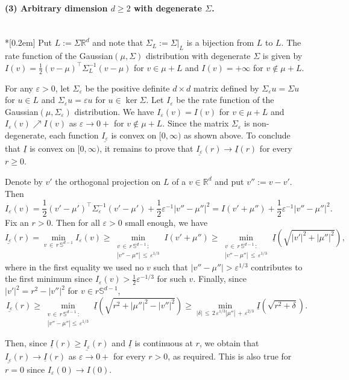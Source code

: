 \documentclass[AHL,Unicode,published]{cedram}
\newcommand{\ubar}[1]{\underline{#1}}
\newcommand{\Rbb}{\mathbb{R}}
\newcommand{\Sbb}{\mathbb{S}}
\begin{document}
\begin{proofc}
\paragraph{(3) Arbitrary dimension $d \ge 2$ with degenerate $\Sigma$.}\ \\*[0.2em]
Put $L:=\Sigma \Rbb^d$ and note that $\Sigma_L:={\Sigma|}_L$ is a bijection from $L$ to $L$. The rate function of the Gaussian$(\mu, \Sigma)$ distribution with degenerate $\Sigma$ is given by $I(v)=\frac12 (v-\mu)^\top \Sigma_L^{-1}(v-\mu)$ for $v \in \mu + L$ and $I(v)=+\infty$ for $v \not \in \mu + L$.

For any $\varepsilon >0$, let $\Sigma_\varepsilon$ be the positive definite $d \times d$ matrix defined by $\Sigma_\varepsilon u = \Sigma u$ for $u \in L$ and $\Sigma_\varepsilon u=\varepsilon u$ for $u \in \ker \Sigma$. Let $I_\varepsilon$ be the rate function of the Gaussian$(\mu, \Sigma_\varepsilon)$ distribution. We have $I_\varepsilon(v)=I(v)$ for $v \in \mu +L$ and $I_\varepsilon(v) \nearrow I(v)$ as $\varepsilon \to 0+$ for $v \not \in \mu +L$. Since the matrix $\Sigma_\varepsilon$ is non-degenerate, each function $\ubar{I_\varepsilon}$ is convex on $[0, \infty)$ as shown above. To conclude that $\ubar I$ is convex on $[0, \infty)$, it remains to prove that $\ubar{I_\varepsilon}(r) \to \ubar I(r)$ for every $r \ge 0$.


Denote by $v'$ the orthogonal projection on $L$ of a $v \in \Rbb^d$ and put $v'':=v-v'$. Then
\[
I_\varepsilon(v)=\frac12 (v'-\mu')^\top \Sigma_\varepsilon^{-1}(v'-\mu') + \frac12 \varepsilon^{-1} \left|v'' - \mu''\right|^2 = I(v'+\mu'') + \frac12 \varepsilon^{-1} \left|v'' - \mu''\right|^2.
\]
Fix an $r > 0$. Then for all $\varepsilon >0$ small enough, we have
\[
\ubar{I_\varepsilon}(r) = \min_{v\,\in\,r\,\Sbb^{d-1} } I_\varepsilon(v) \ge \min_{\substack{v\,\in\,r\,\Sbb^{d-1}\,: \\
\left|v'' - \mu''\right|\,\le\,\varepsilon^{1/3}}} I(v'+\mu'') \ge \min_{\substack{v\,\in\,r\,\Sbb^{d-1}\,: \\
\left|v'' - \mu''\right|\,\le\,\varepsilon^{1/3}}} \ubar I \left(\sqrt{|v'|^2+|\mu''|^2} \right),
\]
where in the first equality we used no $v$ such that $|v'' - \mu''| > \varepsilon^{1/3}$ contributes to the first minimum since $I_\varepsilon(v)>\frac12 \varepsilon^{-1/3}$ for such $v$. Finally, since $|v'|^2=r^2 - |v''|^2$ for $v \in r \Sbb^{d-1}$,
\[
\ubar{I_\varepsilon}(r) \ge \min_{\substack{v\,\in\,r\, \Sbb^{d-1}\,: \\
\left|v'' - \mu''\right|\le\,\varepsilon^{1/3}} } \ubar I \left(\sqrt{r^2+|\mu''|^2-|v''|^2} \right) \ge \min_{|\delta|\,\le\,2\,\varepsilon^{1/3} |\mu''|\,+\,\varepsilon^{2/3} } \ubar I \left(\sqrt{r^2+\delta} \right).
\]

Then, since $\ubar I(r) \ge \ubar{I_\varepsilon}(r) $ and $\ubar I$ is continuous at $r$, we obtain that $\ubar{I_\varepsilon}(r) \to \ubar I(r)$ as $\varepsilon \to 0+$ for every $r>0$, as required. This is also true for $r=0$ since $I_\varepsilon(0) \to I(0)$.\qedhere
\end{proofc}
\end{document}
